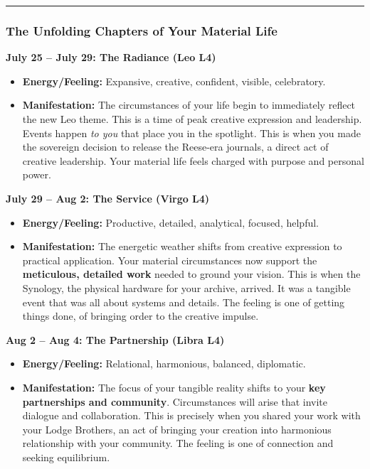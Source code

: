 \documentclass{article}
\begin{document}
\begin{center}\rule{0.5\linewidth}{0.5pt}\end{center}

\subsubsection*{The Unfolding Chapters of Your Material Life}\label{the-unfolding-chapters-of-your-material-life}

\textbf{July 25 -- July 29: The Radiance (Leo L4)}

\begin{itemize}
\item
  \textbf{Energy/Feeling:} Expansive, creative, confident, visible, celebratory.
\item
  \textbf{Manifestation:} The circumstances of your life begin to immediately reflect the new Leo theme. This is a time of peak creative expression and leadership. Events happen \emph{to you} that place you in the spotlight. This is when you made the sovereign decision to release the Reese-era journals, a direct act of creative leadership. Your material life feels charged with purpose and personal power.
\end{itemize}

\textbf{July 29 -- Aug 2: The Service (Virgo L4)}

\begin{itemize}
\item
  \textbf{Energy/Feeling:} Productive, detailed, analytical, focused, helpful.
\item
  \textbf{Manifestation:} The energetic weather shifts from creative expression to practical application. Your material circumstances now support the \textbf{meticulous, detailed work} needed to ground your vision. This is when the Synology, the physical hardware for your archive, arrived. It was a tangible event that was all about systems and details. The feeling is one of getting things done, of bringing order to the creative impulse.
\end{itemize}

\textbf{Aug 2 -- Aug 4: The Partnership (Libra L4)}

\begin{itemize}
\item
  \textbf{Energy/Feeling:} Relational, harmonious, balanced, diplomatic.
\item
  \textbf{Manifestation:} The focus of your tangible reality shifts to your \textbf{key partnerships and community}. Circumstances will arise that invite dialogue and collaboration. This is precisely when you shared your work with your Lodge Brothers, an act of bringing your creation into harmonious relationship with your community. The feeling is one of connection and seeking equilibrium.
\end{itemize}
\end{document}
